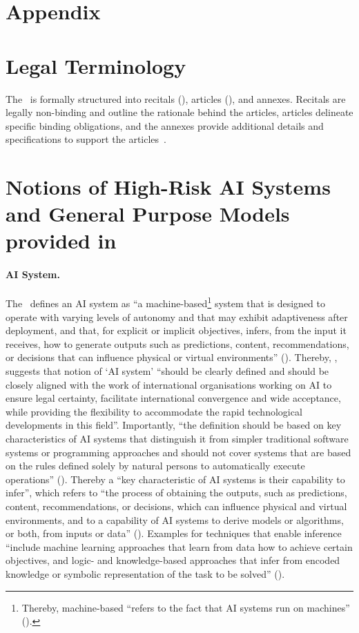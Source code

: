 \section*{Appendix}
\appendix
\section{Legal Terminology}\label{apx:legal}

The \EUAIAct\ is formally structured into recitals (\EWx), articles (\Artx), and annexes. Recitals are legally non-binding and outline the rationale behind the articles, articles delineate specific binding obligations, and the annexes provide additional details and specifications to support the articles~\citep{klimas15law}.


\section{Notions of High-Risk AI Systems and General Purpose Models provided in \EUAIAct }\label{apx:hrais-gpaim}

\paragraph{AI System.} The \EUAIAct\ defines an AI system as ``a machine-based\footnote{Thereby,
machine-based ``refers to the fact that AI systems run on machines'' ().} system that is designed to operate with varying levels
of autonomy and that may exhibit adaptiveness after deployment, and that, for explicit or
implicit objectives, infers, from the input it receives, how to generate outputs such as
predictions, content, recommendations, or decisions that can influence physical or virtual
environments'' (). 
%
Thereby, , suggests that notion of ‘AI system’ ``should be clearly defined and should be
closely aligned with the work of international organisations working on AI to ensure legal
certainty, facilitate international convergence and wide acceptance, while providing the
flexibility to accommodate the rapid technological developments in this field''. Importantly, ``the definition should be based on key characteristics of AI systems that distinguish it from
simpler traditional software systems or programming approaches and should not cover
systems that are based on the rules defined solely by natural persons to automatically
execute operations'' (). 
Thereby a ``key characteristic of AI systems is their capability to infer'', which refers to ``the process of obtaining the outputs, such as predictions,
content, recommendations, or decisions, which can influence physical and virtual
environments, and to a capability of AI systems to derive models or algorithms, or both,
from inputs or data'' (). Examples for techniques that enable inference 
``include machine learning approaches that learn from data how to achieve certain
objectives, and logic- and knowledge-based approaches that infer from encoded knowledge
or symbolic representation of the task to be solved'' ().
%

